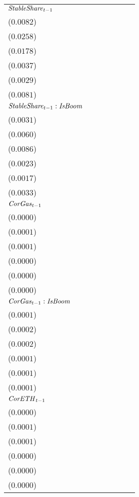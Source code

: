 \begin{tabular}{lllllll}
${\it StableShare}_{t-1}$ & \makecell{$0.0680^{***}$ \\ ($0.0082$)} & \makecell{$0.1961^{***}$ \\ ($0.0258$)} & \makecell{$0.1155^{***}$ \\ ($0.0178$)} & \makecell{$-0.0025^{}$ \\ ($0.0037$)} & \makecell{$-0.0076^{***}$ \\ ($0.0029$)} & \makecell{$0.0705^{***}$ \\ ($0.0081$)} \\
${\it StableShare}_{t-1}:{\it IsBoom}$ & \makecell{$-0.0156^{***}$ \\ ($0.0031$)} & \makecell{$-0.0161^{***}$ \\ ($0.0060$)} & \makecell{$-0.0550^{***}$ \\ ($0.0086$)} & \makecell{$-0.0086^{***}$ \\ ($0.0023$)} & \makecell{$-0.0033^{*}$ \\ ($0.0017$)} & \makecell{$-0.0189^{***}$ \\ ($0.0033$)} \\
${\it CorGas}_{t-1}$ & \makecell{$0.0000^{}$ \\ ($0.0000$)} & \makecell{$0.0001^{}$ \\ ($0.0001$)} & \makecell{$0.0000^{}$ \\ ($0.0001$)} & \makecell{$0.0000^{}$ \\ ($0.0000$)} & \makecell{$-0.0000^{}$ \\ ($0.0000$)} & \makecell{$0.0000^{}$ \\ ($0.0000$)} \\
${\it CorGas}_{t-1}:{\it IsBoom}$ & \makecell{$0.0001^{}$ \\ ($0.0001$)} & \makecell{$0.0001^{}$ \\ ($0.0002$)} & \makecell{$0.0002^{}$ \\ ($0.0002$)} & \makecell{$-0.0000^{}$ \\ ($0.0001$)} & \makecell{$0.0000^{}$ \\ ($0.0001$)} & \makecell{$0.0001^{}$ \\ ($0.0001$)} \\
${\it CorETH}_{t-1}$ & \makecell{$-0.0000^{}$ \\ ($0.0000$)} & \makecell{$-0.0002^{***}$ \\ ($0.0001$)} & \makecell{$-0.0001^{}$ \\ ($0.0001$)} & \makecell{$-0.0000^{}$ \\ ($0.0000$)} & \makecell{$0.0000^{}$ \\ ($0.0000$)} & \makecell{$-0.0001^{*}$ \\ ($0.0000$)} \\

\end{tabular}

